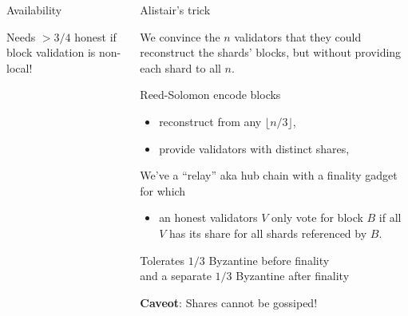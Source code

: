 \documentclass[final]{beamer}
\newlength{\onecolwid}
\newlength{\twocolwid}
\newtheorem*{rawnamedtheorem}{\therawnamedtheorem}
\newcommand{\therawnamedtheorem}{\error}
\newenvironment{namedtheorem}[1]{\renewcommand{\therawnamedtheorem}{#1}
   \begin{rawnamedtheorem}}
  {\end{rawnamedtheorem}}
\begin{document}
\begin{frame}[t]
\begin{columns}[t]
\begin{column}{\twocolwid}
\begin{columns}[t,totalwidth=\twocolwid]
\begin{column}{\onecolwid}
\begin{block}{Availability}
\bigskip
\bigskip

Needs $> 3/4$ honest if block validation is non-local!

\end{block}



\end{column} %

\begin{column}{\onecolwid}\vspace{-.6in} %


\begin{block}{Alistair's trick}

We convince the $n$ validators %
that they could reconstruct the shards' blocks, but
without providing each shard to all $n$.

\bigskip

Reed-Solomon encode blocks 
\begin{itemize}
\item reconstruct from any $\lfloor n/3 \rfloor$,
\item provide validators with distinct shares, 
\end{itemize}

We've a ``relay'' aka hub chain with a finality gadget for which
\begin{itemize}
\item an honest validators $V$ only vote for block $B$ if all $V$ has its share for all shards referenced by $B$.
\end{itemize}

Tolerates $1/3$ Byzantine before finality \\
\hspace*{5pt} and a separate $1/3$ Byzantine after finality

\bigskip
\bigskip

\textbf{Caveot}: Shares cannot be gossiped!


\end{block}
\end{column}
\end{columns}
\end{column}
\end{columns}
\end{frame}
\end{document}
